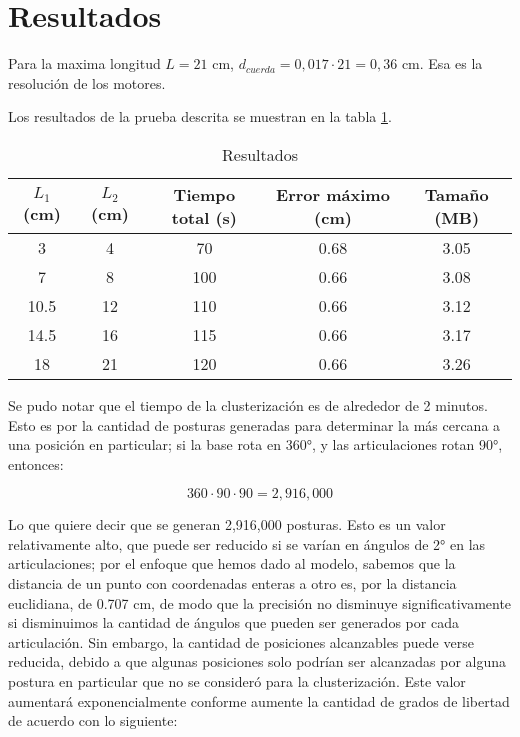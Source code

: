 \section{Resultados}

Para la maxima longitud $L = 21$ cm, $d_{cuerda} = 0,017 \cdot 21 = 0,36$ cm. Esa es la resolución de los motores.

Los resultados de la prueba descrita se muestran en la tabla \ref{tab:Resultados}.

\begin{table}[ht]
	\centering
	\begin{tabular}{|c|c|c|c|c|}
		\hline
		\textbf{$L_1$ (cm)} & \textbf{$L_2$ (cm)} & \textbf{Tiempo total (s)} & \textbf{Error máximo (cm)} & \textbf{Tamaño (MB)} \\
		\hline
		3 & 4 & 70 & 0.68 & 3.05 \\
		7 & 8 & 100 & 0.66 & 3.08 \\
		10.5 & 12 & 110 & 0.66 & 3.12 \\
		14.5 & 16 & 115 & 0.66 & 3.17 \\
		18 & 21 & 120 & 0.66 & 3.26 \\
		\hline
	\end{tabular}
	\caption{Resultados}
	\label{tab:Resultados}
\end{table}

Se pudo notar que el tiempo de la clusterización es de alrededor de 2 minutos. Esto es por la cantidad de posturas generadas para determinar la más cercana a una posición en particular; si la base rota en 360°, y las articulaciones rotan 90°, entonces:

\begin{equation}
	360 \cdot 90 \cdot 90 = 2,916,000
\end{equation}

Lo que quiere decir que se generan 2,916,000 posturas. Esto es un valor relativamente alto, que puede ser reducido si se varían en ángulos de 2° en las articulaciones; por el enfoque que hemos dado al modelo, sabemos que la distancia de un punto con coordenadas enteras a otro es, por la distancia euclidiana, de 0.707 cm, de modo que la precisión no disminuye significativamente si disminuimos la cantidad de ángulos que pueden ser generados por cada articulación. Sin embargo, la cantidad de posiciones alcanzables puede verse reducida, debido a que algunas posiciones solo podrían ser alcanzadas por alguna postura en particular que no se consideró para la clusterización. Este valor aumentará exponencialmente conforme aumente la cantidad de grados de libertad de acuerdo con lo siguiente:

